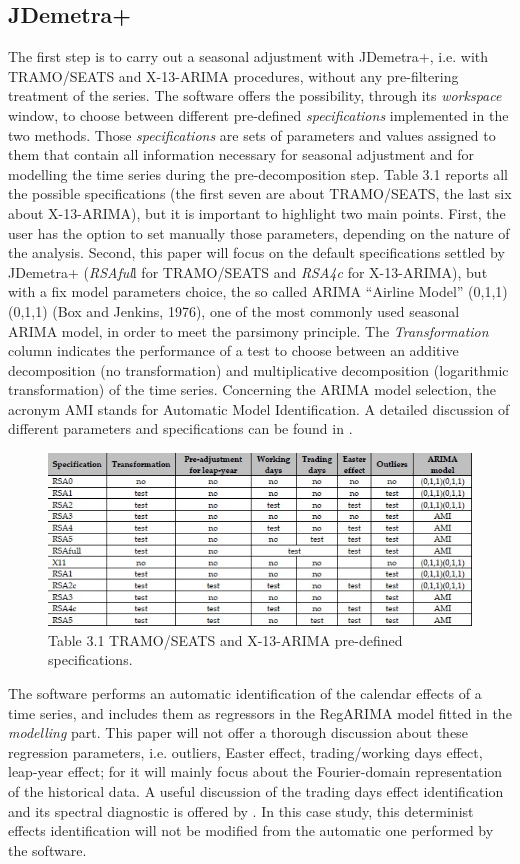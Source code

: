 \documentclass[english,blauw]{cbsdiscussionpaper}
\begin{document}
\subsection{JDemetra+}
The first step is to carry out a seasonal adjustment with JDemetra+, i.e. with TRAMO/SEATS and X-13-ARIMA procedures, without any pre-filtering treatment of the series. The software offers the possibility, through its \textit{workspace} window, to choose between different pre-defined \textit{specifications} implemented in the two methods. Those \textit{specifications} are sets of parameters and values assigned to them that contain all information necessary for seasonal adjustment and for modelling the time series during the pre-decomposition step. Table 3.1 reports all the possible specifications (the first seven are about TRAMO/SEATS, the last six about X-13-ARIMA), but it is important to highlight two main points. First, the user has the option to set manually those parameters, depending on the nature of the analysis. Second, this paper will focus on the default specifications settled by JDemetra+ (\textit{RSAful}l for TRAMO/SEATS and \textit{RSA4c} for X-13-ARIMA), but with a fix model parameters choice, the so called ARIMA ``Airline Model'' (0,1,1)(0,1,1) (Box and Jenkins, 1976), one of the most commonly used seasonal ARIMA model, in order to meet the parsimony principle. The \textit{Transformation} column indicates the performance of a test to choose between an additive decomposition (no transformation) and multiplicative decomposition (logarithmic transformation) of the time series. Concerning the ARIMA model selection, the acronym AMI stands for Automatic Model Identification. A detailed discussion of different parameters and specifications can be found in \citep{gru2015}.
\begin{figure}[h]
\includegraphics[width=\linewidth]{../images/capitolo3/specification.jpg}
\caption*{Table 3.1 \quad TRAMO/SEATS and X-13-ARIMA pre-defined specifications.}
\label{fig:specification}
\end{figure}
The software performs an automatic identification of the calendar effects of a time series, and includes them as regressors in the RegARIMA model fitted in the \textit{modelling} part. This paper will not offer a thorough discussion about these regression parameters, i.e. outliers, Easter effect, trading/working days effect, leap-year effect; for it will mainly focus about the Fourier-domain representation of the historical data. A useful discussion of the trading days effect identification and its spectral diagnostic is offered by \citep{fineal1999}. In this case study, this determinist effects identification will not be modified from the automatic one performed by the software.
\end{document}
